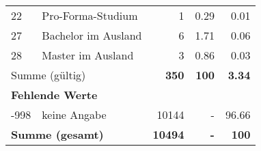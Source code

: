 \begin{longtable}{lXrrr}
     22 &
     \multicolumn{1}{X}{ Pro-Forma-Studium   } &


       \num{1} &
       \num[round-mode=places,round-precision=2]{0,29} &
         \num[round-mode=places,round-precision=2]{0,01} \\

     27 &
     \multicolumn{1}{X}{ Bachelor im Ausland   } &


       \num{6} &
       \num[round-mode=places,round-precision=2]{1,71} &
         \num[round-mode=places,round-precision=2]{0,06} \\

     28 &
     \multicolumn{1}{X}{ Master im Ausland   } &


       \num{3} &
       \num[round-mode=places,round-precision=2]{0,86} &
         \num[round-mode=places,round-precision=2]{0,03} \\
     \midrule
     \multicolumn{2}{l}{Summe (gültig)} &
       \textbf{\num{350}} &
     \textbf{100} &
       \textbf{\num[round-mode=places,round-precision=2]{3,34}} \\
     \multicolumn{5}{l}{\textbf{Fehlende Werte}}\\
       -998 &
       keine Angabe &
         \num{10144} &
        - &
         \num[round-mode=places,round-precision=2]{96,66} \\
     \midrule
     \multicolumn{2}{l}{\textbf{Summe (gesamt)}} &
          \textbf{\num{10494}} &
        \textbf{-} &
        \textbf{100} \\
     \bottomrule
     \end{longtable}
     
